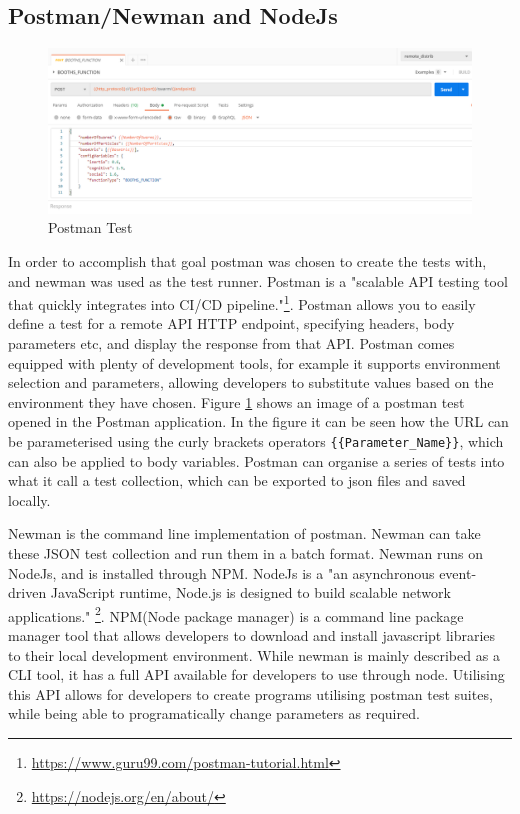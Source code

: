 \documentclass[oneside,12pt]{book}
\begin{document}
\subsection{Postman/Newman and NodeJs}
\begin{figure}[H]
    \centering
    \includegraphics[scale=0.5]{Images/PostmanTest.png}
    \caption{Postman Test}
    \label{fig:PostmanTest}
\end{figure}
In order to accomplish that goal postman was chosen to create the tests with, and newman was used as the test runner. Postman is a "scalable API testing tool that quickly integrates into CI/CD pipeline."\footnote{\url{https://www.guru99.com/postman-tutorial.html}}. Postman allows you to easily define a test for a remote API HTTP endpoint, specifying headers, body parameters etc, and display the response from that API. Postman comes equipped with plenty of development tools, for example it supports environment selection and parameters, allowing developers to substitute values based on the environment they have chosen. Figure \ref{fig:PostmanTest} shows an image of a postman test opened in the Postman application. In the figure it can be seen how the URL can be parameterised using the curly brackets operators \verb|{{Parameter_Name}}|, which can also be applied to body variables.  Postman can organise a series of tests into what it call a test collection, which can be exported to json files and saved locally. 


Newman is the command line implementation of postman. Newman can take these JSON test collection and run them in a batch format. Newman runs on NodeJs, and is installed through NPM. NodeJs is a "an asynchronous event-driven JavaScript runtime, Node.js is designed to build scalable network applications." \footnote{\url{https://nodejs.org/en/about/}}. NPM(Node package manager) is a command line package manager tool that allows developers to download and install javascript libraries to their local development environment. While newman is mainly described as a CLI tool, it has a full API available for developers to use through node. Utilising this API allows for developers to create programs utilising postman test suites, while being able to programatically change parameters as required. 
\end{document}
